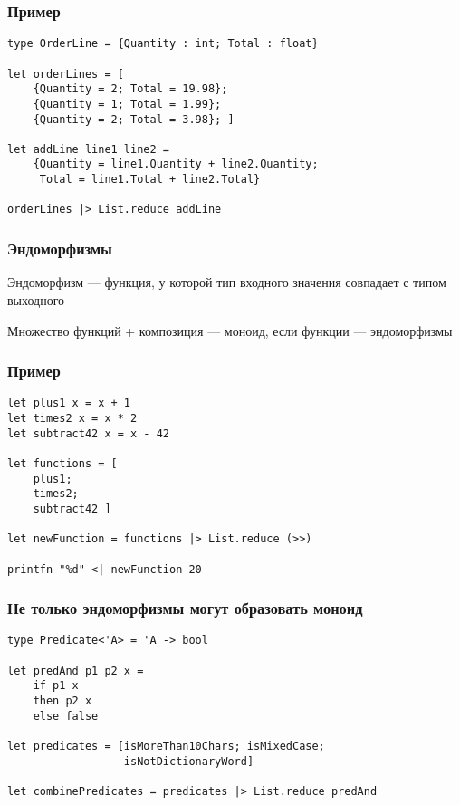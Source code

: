 \documentclass{../../slides-style}
\begin{document}
    \begin{frame}[fragile]
        \frametitle{Пример}
        \begin{verbatim}
type OrderLine = {Quantity : int; Total : float}

let orderLines = [
    {Quantity = 2; Total = 19.98};
    {Quantity = 1; Total = 1.99};
    {Quantity = 2; Total = 3.98}; ]
    
let addLine line1 line2 =
    {Quantity = line1.Quantity + line2.Quantity; 
     Total = line1.Total + line2.Total}
     
orderLines |> List.reduce addLine
        \end{verbatim}
    \end{frame}

    \begin{frame}
        \frametitle{Эндоморфизмы}
        Эндоморфизм --- функция, у которой тип входного значения совпадает с типом выходного
        
        \vspace{1cm}
        Множество функций + композиция --- моноид, если функции --- эндоморфизмы
    \end{frame}

    \begin{frame}[fragile]
        \frametitle{Пример}
        \begin{verbatim}
let plus1 x = x + 1
let times2 x = x * 2
let subtract42 x = x - 42

let functions = [
    plus1;
    times2;
    subtract42 ]

let newFunction = functions |> List.reduce (>>)

printfn "%d" <| newFunction 20
        \end{verbatim}
    \end{frame}

    \begin{frame}[fragile]
        \frametitle{Не только эндоморфизмы могут образовать моноид}
        \begin{verbatim}
type Predicate<'A> = 'A -> bool

let predAnd p1 p2 x = 
    if p1 x 
    then p2 x
    else false

let predicates = [isMoreThan10Chars; isMixedCase; 
                  isNotDictionaryWord]

let combinePredicates = predicates |> List.reduce predAnd
        \end{verbatim}
    \end{frame}
\end{document}
